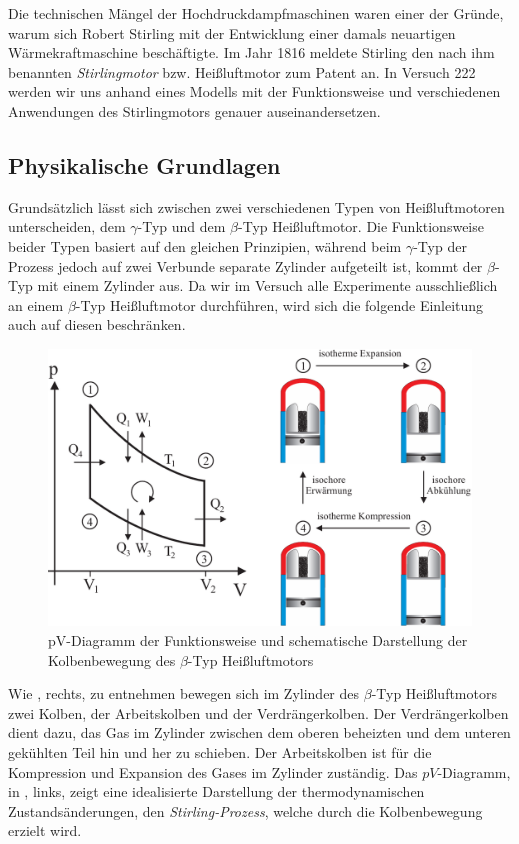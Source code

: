 Die technischen Mängel der Hochdruckdampfmaschinen waren einer der Gründe, warum sich Robert Stirling mit der Entwicklung einer damals neuartigen Wärmekraftmaschine beschäftigte. Im Jahr 1816 meldete Stirling den nach ihm benannten \textit{Stirlingmotor} bzw. Heißluftmotor zum Patent an. In Versuch 222 werden wir uns anhand eines Modells mit der Funktionsweise und verschiedenen Anwendungen des Stirlingmotors genauer auseinandersetzen.

\subsection{Physikalische Grundlagen}

Grundsätzlich lässt sich zwischen zwei verschiedenen Typen von Heißluftmotoren unterscheiden, dem $\gamma$-Typ und dem $\beta$-Typ Heißluftmotor. Die Funktionsweise beider Typen basiert auf den gleichen Prinzipien, während beim $\gamma$-Typ der Prozess jedoch auf zwei Verbunde separate Zylinder aufgeteilt ist, kommt der $\beta$-Typ mit einem Zylinder aus. Da wir im Versuch alle Experimente ausschließlich an einem $\beta$-Typ Heißluftmotor durchführen, wird sich die folgende Einleitung auch auf diesen beschränken.

\begin{figure}[H]
  \centering
  \includegraphics[width=.65\textwidth]{files/type_b_pv_scheme.png}
  \caption{pV-Diagramm der Funktionsweise und schematische Darstellung der Kolbenbewegung des $\beta$-Typ Heißluftmotors}
  \label{fig:type_b_pv_scheme}
\end{figure}

Wie , rechts, zu entnehmen bewegen sich im Zylinder des $\beta$-Typ Heißluftmotors zwei Kolben, der Arbeitskolben und der Verdrängerkolben. Der Verdrängerkolben dient dazu, das Gas im Zylinder zwischen dem oberen beheizten und dem unteren gekühlten Teil hin und her zu schieben. Der Arbeitskolben ist für die Kompression und Expansion des Gases im Zylinder zuständig. Das $pV$-Diagramm, in , links, zeigt eine idealisierte Darstellung der thermodynamischen Zustandsänderungen, den \textit{Stirling-Prozess}, welche durch die Kolbenbewegung erzielt wird.


